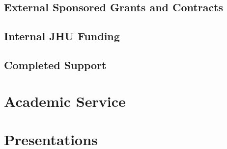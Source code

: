 \documentclass[11pt,a4paper]{moderncv}
\begin{document}
\subsection{External Sponsored Grants and Contracts}


\subsection{Internal JHU Funding}



\subsection{Completed Support}


\section{Academic Service}


\section{Presentations}



%


%
\end{document}
